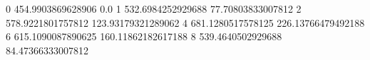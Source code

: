 0 454.9903869628906 0.0
1 532.6984252929688 77.70803833007812
2 578.9221801757812 123.93179321289062
4 681.1280517578125 226.13766479492188
6 615.1090087890625 160.11862182617188
8 539.4640502929688 84.47366333007812
